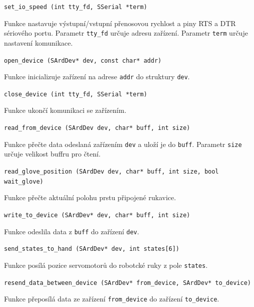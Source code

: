 \documentclass[thesis=B,czech]{FITthesis}[2012/06/26]
\begin{document}
\texttt{set\_io\_speed (int tty\_fd, SSerial *term)}


Funkce nastavuje výstupní/vstupní přenosovou rychlost a piny RTS a DTR sériového portu. Parametr \texttt{tty\_fd} určuje adresu zařízení. Parametr \texttt{term} určuje nastavení komunikace.

\hspace{2cm}

\texttt{open\_device (SArdDev* dev, const char* addr)}


Funkce inicializuje zařízení na adrese \texttt{addr} do struktury \texttt{dev}.

\hspace{2cm}


\texttt{close\_device (int tty\_fd, SSerial *term)}

Funkce ukončí komunikaci se zařízením.

\hspace{2cm}

\texttt{read\_from\_device (SArdDev dev, char* buff, int size)}

Funkce přečte data odeslaná zařízením \texttt{dev} a uloží je do \texttt{buff}. Parametr \texttt{size} určuje velikost buffru pro čtení.

\hspace{2cm}

\texttt{read\_glove\_position (SArdDev dev, char* buff, int size, bool wait\_glove)}

Funkce přečte aktuální polohu prstu připojené rukavice. 

\hspace{2cm}

\texttt{write\_to\_device (SArdDev* dev, char* buff, int size)}

Funkce odeslila data z  \texttt{buff} do zařízení \texttt{dev}.

\hspace{2cm}


\texttt{send\_states\_to\_hand (SArdDev* dev, int states[6])}

Funkce posílá pozice servomotorů do robotcké ruky z pole \texttt{states}. 


\hspace{2cm}


\texttt{resend\_data\_between\_device (SArdDev* from\_device, SArdDev* to\_device)}

Funkce přeposílá data ze zařízení \texttt{from\_device} do zařízení \texttt{to\_device}.

\hspace{2cm}
\end{document}
